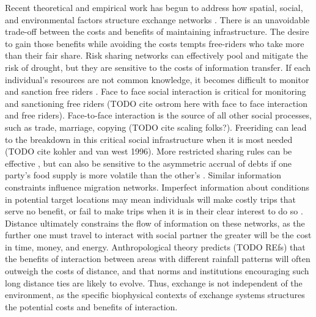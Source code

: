 \documentclass[fleqn,10pt]{wlscirep}
\begin{document}
Recent theoretical and empirical work has begun to address how spatial, social, and environmental factors structure exchange networks \cite{Nolin2010Food-SharingIndonesia,Koster2014,Hao2015,Schnegg2015}. There is an unavoidable trade-off between the costs and benefits of maintaining infrastructure. The desire to gain those benefits while avoiding the costs tempts free-riders who take more than their fair share. Risk sharing networks can effectively pool and mitigate the risk of drought, but they are sensitive to the costs of information transfer. If each individual's resources are not common knowledge, it becomes difficult to monitor and sanction free riders \cite{Hao2015a}. Face to face social interaction is critical for monitoring and sanctioning free riders (TODO cite ostrom here with face to face interaction and free riders). Face-to-face interaction is the source of all other social processes, such as trade, marriage, copying (TODO cite scaling folks?). Freeriding can lead to the breakdown in this critical social infrastructure when it is most needed (TODO cite kohler and van west 1996). More restricted sharing rules can be effective \cite{Hegmon1996}, but can also be sensitive to the asymmetric accrual of debts if one party's food supply is more volatile than the other's \cite{Crabtree2015}. Similar information constraints influence migration networks. Imperfect information about conditions in potential target locations may mean individuals will make costly trips that serve no benefit, or fail to make trips when it is in their clear interest to do so \cite{Anderies2011a}. Distance ultimately constrains the flow of information on these networks, as the further one must travel to interact with social partner the greater will be the cost in time, money, and energy. Anthropological theory predicts (TODO REfs) that the benefits of interaction between areas with different rainfall patterns will often outweigh the costs of distance, and that norms and institutions encouraging such long distance ties are likely to evolve. Thus, exchange is not independent of the environment, as the specific biophysical contexts of exchange systems structures the potential costs and benefits of interaction.
\end{document}
